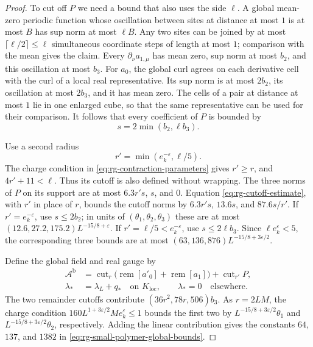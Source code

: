 \begin{proof}
To cut off $P$ we need a bound that also uses the side
$\ell$. A global mean-zero periodic function whose
oscillation between sites at distance at most $1$ is at
most $B$ has sup norm at most $\ell B$. Any two sites
can be joined by at most $\lceil\ell/2\rceil\le\ell$
simultaneous coordinate steps of length at most $1$;
comparison with the mean gives the claim.
Every $\partial_\nu a_{1,\mu}$ has mean zero, sup norm
at most $b_2$, and this oscillation at most $b_3$.
For $a_0$, the global curl agrees on each derivative
cell with the curl of a local real representative.
Its sup norm is at most $2b_2$, its oscillation at most
$2b_3$, and it has mean zero. The cells of a pair at
distance at most $1$ lie in one enlarged cube, so that
the same representative can be used for their comparison.
It follows that every coefficient of $P$ is bounded by
\begin{equation}\label{eq:rg-linear-slope-bound}
 s=2\min(b_2,\ell b_3).
\end{equation}

Use a second radius
\[
 r'=\min(e_k^{-\varepsilon},\ell/5).
\]
The charge condition in \eqref{eq:rg-contraction-parameters}
gives $r'\ge r$, and $4r'+11<\ell$. Thus its cutoff is
also defined without wrapping. The three norms of $P$
on its support are at most $6.3r's$, $s$, and $0$.
Equation \eqref{eq:rg-cutoff-estimate}, with $r'$ in
place of $r$, bounds the cutoff norms by
$6.3r's$, $13.6s$, and $87.6s/r'$.
If $r'=e_k^{-\varepsilon}$, use $s\le2b_2$;
in units of $(\theta_1,\theta_2,\theta_3)$ these are
at most $(12.6,27.2,175.2)L^{-15/8+\varepsilon}$.
If $r'=\ell/5<e_k^{-\varepsilon}$, use
$s\le2\ell b_3$. Since $\ell e_k^\varepsilon<5$,
the corresponding three bounds are at most
$(63,136,876)L^{-15/8+3\varepsilon/2}$.

Define the global field and real gauge by
\begin{equation}\label{eq:rg-global-representative-construction}
 \begin{split}
 \mathscr A^{\mathrm b}
   &=\operatorname{cut}_r
             \big(\operatorname{rem}[a'_0]+\operatorname{rem}[a_1]\big)
                  +\operatorname{cut}_{r'}P,\\
 \lambda_*&=\lambda_L+q_*\quad\text{on }K_{\mathrm{loc}},
                  \qquad \lambda_*=0\quad\text{elsewhere}.
 \end{split}
\end{equation}
The two remainder cutoffs contribute
$(36r^2,78r,506)b_3$. As $r=2LM$, the charge condition
$160L^{1+3\varepsilon/2}Me_k^\varepsilon\le1$ bounds
the first two by $L^{-15/8+3\varepsilon/2}\theta_1$
and $L^{-15/8+3\varepsilon/2}\theta_2$, respectively.
Adding the linear contribution gives the constants
$64$, $137$, and $1382$ in
\eqref{eq:rg-small-polymer-global-bounds}.


\end{proof}
